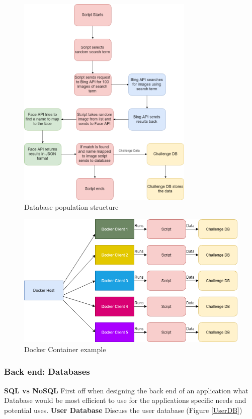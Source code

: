 \documentclass[12pt,a4paper]{article}
\begin{document}
\begin{figure}[h]
    \centering
    \includegraphics[width=0.75\textwidth]{Figs/Dbinsert_structure.png} 
    \caption{Database population structure} 
    \label{Dockerstructure}
\end{figure} 

\begin{figure}[h]
    \centering
    \includegraphics[width=1.0\textwidth]{Figs/Docker.png} 
    \caption{Docker Container example} 
    \label{Dockerexample}
\end{figure}

\subsubsection{Back end: Databases} 
\textbf{SQL vs NoSQL}   
First off when designing the back end of an application what Database would be most efficient to use for the applications specific needs and potential uses. 
\textbf{User Database}   
Discuss the user database (Figure \ref{UserDB})
\end{document}
